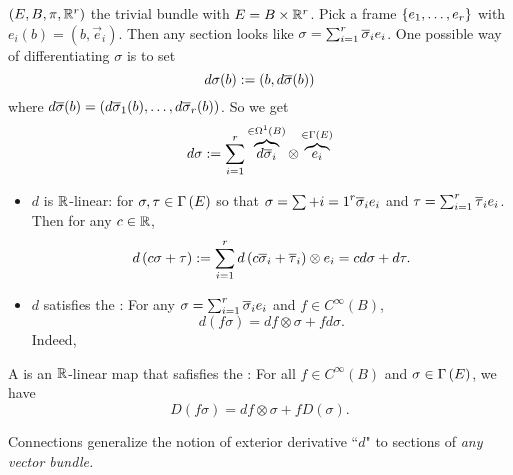 \documentclass[main.tex]{subfiles}
\begin{document}
 $(E, B, \pi, \mathbb{R}^r)$ the trivial bundle with $E = B \times \mathbb{R}^r$. Pick a frame $\left\{e_1, \dots, e_r\right\}$ with $e_i(b) = (b, \vec{e}_i)$. Then any section looks like $\sigma = \sum_{i=1}^r \overline{\sigma}_i e_i$. One possible way of differentiating $\sigma$ is to set
\[
d\sigma(b):= (b, d \overline{\sigma}(b))
\]
where $d\overline{\sigma}(b) = \left(  d\overline{\sigma}_1(b), \dots, d \overline{\sigma}_r(b)  \right)$. So we get
\[
d \sigma := \sum_{i=1}^r  \overbrace{d\overline{\sigma}_i}^{\in \Omega^1(B)} \otimes \overbrace{e_i}^{\in \Gamma\left( E \right)}
\]

\begin{note}
    \begin{itemize}
        \item $d$ is $\mathbb{R}$-linear: for $\sigma, \tau \in \Gamma\left( E \right)$ so that $\sigma = \sum+{i=1}^r \overline{\sigma}_i e_i$ and $\tau = \sum_{i=1}^r \overline{\tau}_i e_i$. Then for any $c \in \mathbb{R}$,
        \[
        d\left(  c\sigma + \tau  \right) := \sum_{i=1}^r d\left(  c \overline{\sigma}_i + \overline{\tau}_i  \right) \otimes e_i = cd\sigma + d\tau.
        \]
        \item $d$ satisfies the : For any $\sigma = \sum_{i=1}^r \overline{\sigma}_i e_i$ and $f \in C^\infty(B)$,
        \[
        d(f\sigma) = df \otimes \sigma + f d\sigma.
        \]
        Indeed,
    \end{itemize}
\end{note}

\begin{defn}
A  is an $\mathbb{R}$-linear map
that safisfies the : For all $f \in C^\infty(B)$ and $\sigma \in \Gamma\left( E \right)$, we have
\[
D(f\sigma) = df \otimes \sigma + f D(\sigma).
\]
\end{defn}

\begin{note}
Connections generalize the notion of exterior derivative ``$d$" to sections of \it{any} vector bundle.
\end{note}
\end{document}
